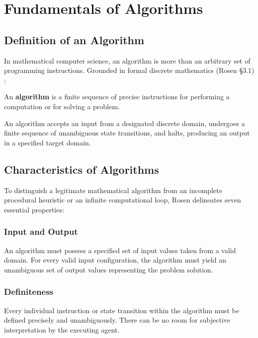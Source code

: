 \chapter{Fundamentals of Algorithms}
\label{chap:fundamentals}

\section{Definition of an Algorithm}
In mathematical computer science, an algorithm is more than an arbitrary set of programming instructions. Grounded in formal discrete mathematics (Rosen §3.1) \cite{rosen2019discrete}:

\begin{definition}[Algorithm]
An \textbf{algorithm} is a finite sequence of precise instructions for performing a computation or for solving a problem.
\end{definition}

An algorithm accepts an input from a designated discrete domain, undergoes a finite sequence of unambiguous state transitions, and halts, producing an output in a specified target domain.

\section{Characteristics of Algorithms}
To distinguish a legitimate mathematical algorithm from an incomplete procedural heuristic or an infinite computational loop, Rosen delineates seven essential properties:

\subsection{Input and Output}
\begin{property}
An algorithm must possess a specified set of input values taken from a valid domain. For every valid input configuration, the algorithm must yield an unambiguous set of output values representing the problem solution.
\end{property}

\subsection{Definiteness}
\begin{property}[Definiteness]
Every individual instruction or state transition within the algorithm must be defined precisely and unambiguously. There can be no room for subjective interpretation by the executing agent.
\end{property}

